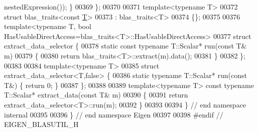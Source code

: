 \begin{DoxyCode}
      nestedExpression()); \}
00369 \};
00370 
00371 \textcolor{keyword}{template}<\textcolor{keyword}{typename} T>
00372 \textcolor{keyword}{struct }blas\_traits<const \hyperlink{group___sparse_core___module_class_eigen_1_1_triplet}{T}>
00373      : blas\_traits<T>
00374 \{\};
00375 
00376 template<typename T, bool HasUsableDirectAccess=blas\_traits<T>::HasUsableDirectAccess>
00377 \textcolor{keyword}{struct }extract\_data\_selector \{
00378   \textcolor{keyword}{static} \textcolor{keyword}{const} \textcolor{keyword}{typename} T::Scalar* run(\textcolor{keyword}{const} T& m)
00379   \{
00380     \textcolor{keywordflow}{return} blas\_traits<T>::extract(m).data();
00381   \}
00382 \};
00383 
00384 \textcolor{keyword}{template}<\textcolor{keyword}{typename} T>
00385 \textcolor{keyword}{struct }extract\_data\_selector<T,false> \{
00386   \textcolor{keyword}{static} \textcolor{keyword}{typename} T::Scalar* run(\textcolor{keyword}{const} T&) \{ \textcolor{keywordflow}{return} 0; \}
00387 \};
00388 
00389 \textcolor{keyword}{template}<\textcolor{keyword}{typename} T> \textcolor{keyword}{const} \textcolor{keyword}{typename} T::Scalar* extract\_data(\textcolor{keyword}{const} T& m)
00390 \{
00391   \textcolor{keywordflow}{return} extract\_data\_selector<T>::run(m);
00392 \}
00393 
00394 \} \textcolor{comment}{// end namespace internal}
00395 
00396 \} \textcolor{comment}{// end namespace Eigen}
00397 
00398 \textcolor{preprocessor}{#endif // EIGEN\_BLASUTIL\_H}
\end{DoxyCode}
